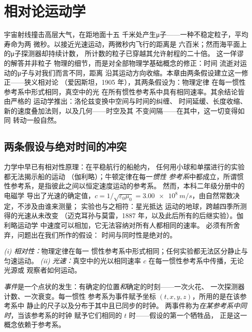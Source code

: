 \chapter{相对论运动学}\label{ch:b3:relativistic-kinematics}

宇宙射线撞击高层大气，在距地面十五
千米处产生μ子——一种不稳定粒子，平均寿命为两
微秒。以接近光速运动，两微秒内飞行的距离是
六百米；然而海平面上的μ子探测器却持续计数，
所计数的粒子已穿越其允许射程的二十倍。
这一佯谬的解答并非粒子
物理的细节，而是对全部物理学基础概念的修正：时间
流逝对运动的μ子与对我们而言不同，距离
沿其运动方向收缩。本章由两条假设建立这一修正——狭义相对论
（爱因斯坦，1905 年），其两条假设为：物理定律
在每一惯性参考系中形式相同，真空中的光
在所有惯性参考系中具有相同速率。其余结论皆由严格的
运动学推出：洛伦兹变换中空间与时间的纠缠、
时间延缓、长度收缩、
新的速度叠加法则，以及几何——时空及其
不变间隔——在其中，这一切变得如同
转动一般自然。

\section{两条假设与绝对时间的冲突}

\begin{remark}[冲突从何而来]\label{rem:b3:relativistic-kinematics:conflict}
力学中早已有相对性原理：在平稳航行的船舱内，
任何用小球和单摆进行的实验都无法揭示船的运动
（伽利略）；牛顿定律在每一\emph{惯性
参考系}中都成立，所谓惯性参考系，是指彼此之间以恒定速度运动的参考系。
然而，本科二年级分册中的电磁学
导出了光速的确定值，$c = 1/\sqrt{\varepsilon_0\mu_0} =
\qty{3.00e8}{m/s}$，由自然常数决定，不涉及由谁来测量；
实验也与之相符：星光抵达
运动的地球，跨越四季所测得的光速从未改变
（迈克耳孙与莫雷，1887 年，以及此后所有的后继实验）。伽利略运动学
中速度可以相加，它无法容纳对所有人都相同的速率。
必须有所舍弃，问题出在我们所作的假设：
时间与同时性是绝对的。
\end{remark}

\begin{theorem}[狭义相对论的假设]\label{thm:b3:relativistic-kinematics:postulates}
\emph{(i) 相对性：}物理定律在每一
惯性参考系中形式相同；任何实验都无法区分静止与匀速运动。
\emph{(ii) 光速：}真空中的光以相同速率 $c$
在每一惯性参考系中传播，无论光源或
观察者如何运动。
\end{theorem}
\admitted

\begin{definition}[事件与同时性]\label{def:b3:relativistic-kinematics:event}
\emph{事件}是一个点状的发生：有确定的位置\emph{和}确定的时刻——一次火花、
一次探测器计数、一次衰变。每一惯性
参考系为事件赋予坐标 $(t, x, y, z)$，所用的是在该参考系中
静止的尺子以及分布于其中且已同步的时钟。
两事件称为\emph{在某参考系中同时}，当该参考系的时钟
赋予它们相同的 $t$ 时——假设的第一个牺牲品，
正是这一概念依赖于参考系。
\end{definition}

